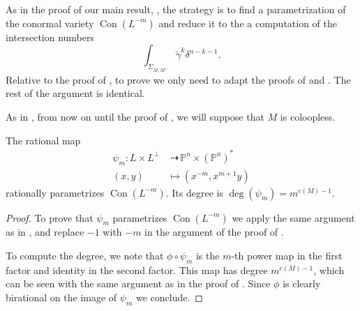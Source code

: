 \documentclass[12pt,a4paper,english]{scrartcl}
\newcommand{\PP}{\mathbb{P}}
\DeclareMathOperator{\Con}{Con}
\begin{document}
As in the proof of our main result, , the strategy is to find a parametrization of the conormal variety $\Con(L^{-m})$ and reduce it to the a computation of the intersection numbers
\[
\int_{\Sigma_{M,M^\perp}}\widetilde{\gamma}^k\delta^{n-k-1}.
\]
Relative to the proof of , to prove  we only need to adapt the proofs of  and . The rest of the argument is identical.

As in , from now on until the proof of , we will  suppose that $M$ is coloopless. 

\begin{proposition}
    \label{prop: paramerizationwithk}
The rational map
\begin{align*}
\psi_m \colon L \times L^\perp &\;\dashrightarrow \, \PP^n \times (\PP^n)^* \\
 (x, y) &\longmapsto  (x^{-m}, x^{m+1}y)
\end{align*}
rationally parametrizes $\Con(L^{-m})$. Its degree is $\deg(\psi_m) = m^{c(M)-1}$.
\end{proposition}
\begin{proof}
To prove that $\psi_m$ parametrizes $\Con(L^{-m})$ we apply the same argument as in , and replace $-1$ with $-m$ in the argument of the proof of \cite[Proposition 4.1]{MatsubaraHeoTelen2026}.

To compute the degree, we note that $\phi\circ \psi_m$ is the $m$-th power map in the first factor and identity in the second factor. This map has degree $m^{c(M)-1}$, which can be seen with the same argument as in the proof of . Since $\phi$ is clearly birational on the image of $\psi_m$ we conclude.
\end{proof}
\end{document}
